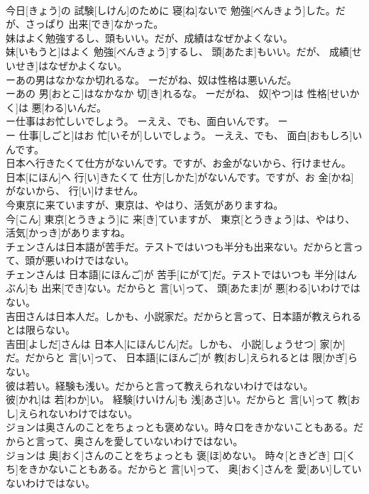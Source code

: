 \documentclass[8pt]{extreport}
\begin{document}
\begin{CJK}{UTF8}{min}
\\	今日[きょう]の 試験[しけん]のために 寝[ね]ないで 勉強[べんきょう]した。だが、さっぱり 出来[でき]なかった。
\\	妹はよく勉強するし、頭もいい。だが、成績はなぜかよくない。	
\\	妹[いもうと]はよく 勉強[べんきょう]するし、 頭[あたま]もいい。だが、 成績[せいせき]はなぜかよくない。
\\	ーあの男はなかなか切れるな。 ーだがね、奴は性格は悪いんだ。	
\\	ーあの 男[おとこ]はなかなか 切[き]れるな。 ーだがね、 奴[やつ]は 性格[せいかく]は 悪[わる]いんだ。
\\	ー仕事はお忙しいでしょう。 ーええ、でも、面白いんです。	ー
\\	ー 仕事[しごと]はお 忙[いそが]しいでしょう。 ーええ、でも、 面白[おもしろ]いんです。
\\	日本へ行きたくて仕方がないんです。ですが、お金がないから、行けません。	
\\	日本[にほん]へ 行[い]きたくて 仕方[しかた]がないんです。ですが、お 金[かね]がないから、 行[い]けません。
\\	今東京に来ていますが、東京は、やはり、活気がありますね。	
\\	今[こん] 東京[とうきょう]に 来[き]ていますが、 東京[とうきょう]は、やはり、 活気[かっき]がありますね。
\\	チェンさんは日本語が苦手だ。テストではいつも半分も出来ない。だからと言って、頭が悪いわけではない。	
\\	チェンさんは 日本語[にほんご]が 苦手[にがて]だ。テストではいつも 半分[はんぶん]も 出来[でき]ない。だからと 言[い]って、 頭[あたま]が 悪[わる]いわけではない。
\\	吉田さんは日本人だ。しかも、小説家だ。だからと言って、日本語が教えられるとは限らない。	
\\	吉田[よしだ]さんは 日本人[にほんじん]だ。しかも、 小説[しょうせつ] 家[か]だ。だからと 言[い]って、 日本語[にほんご]が 教[おし]えられるとは 限[かぎ]らない。
\\	彼は若い。経験も浅い。だからと言って教えられないわけではない。	
\\	彼[かれ]は 若[わか]い。 経験[けいけん]も 浅[あさ]い。だからと 言[い]って 教[おし]えられないわけではない。
\\	ジョンは奥さんのことをちょっとも褒めない。時々口をきかないこともある。だからと言って、奥さんを愛していないわけではない。	
\\	ジョンは 奥[おく]さんのことをちょっとも 褒[ほ]めない。 時々[ときどき] 口[くち]をきかないこともある。だからと 言[い]って、 奥[おく]さんを 愛[あい]していないわけではない。

\end{CJK}
\end{document}
